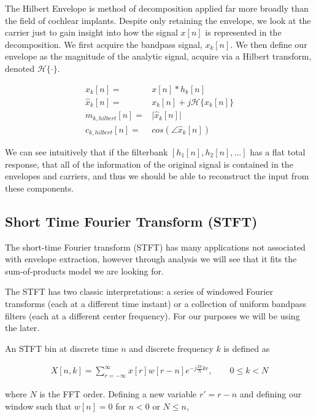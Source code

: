 \documentclass [11pt, proquest] {uwthesis}[2015/03/03]
\begin{document}
The Hilbert Envelope is method of decomposition applied far more broadly than the field of cochlear implants.  Despite only retaining the envelope, we look at the carrier just to gain insight into how the signal $x[n]$ is represented in the decomposition.  We first acquire the bandpass signal, $x_k[n]$.  We then define our envelope as the magnitude of the analytic signal, acquire via a Hilbert transform, denoted $\mathcal{H}\{\cdot\}$.

\begin{align}
x_k[n] =& x[n] * h_k[n] \\
\widehat{x}_k[n] =& x_k[n] + j\mathcal{H}\{x_k[n]\} \\
\label{eq:hilbert_envelope}
m_{k,hilbert}[n] =& \Big| \widehat{x}_k[n] \Big| \\
c_{k,hilbert}[n] =& cos(\angle\widehat{x}_k[n])
\end{align}

We can see intuitively that if the filterbank $[h_1[n], h_2[n], ...]$ has a flat total response, that all of the information of the original signal is contained in the envelopes and carriers, and thus we should be able to reconstruct the input from these components.

\subsection{Short Time Fourier Transform (STFT)}

The short-time Fourier transform (STFT) has many applications not associated with envelope extraction, however through analysis we will see that it fits the sum-of-products model we are looking for.

The STFT has two classic interpretations: a series of windowed Fourier transforms (each at a different time instant) or a collection of uniform bandpass filters (each at a different center frequency).  For our purposes we will be using the later.

An STFT bin at discrete time $n$ and discrete frequency $k$ is defined as

\begin{align}
\label{eq:STFTdefinition}
X[n,k] = \sum\limits_{r=-\infty}^{\infty} x[r] w[r - n] e^{-j\frac{2\pi}{N}kr}, \qquad 0 \leq k < N
\end{align}

where $N$ is the FFT order.  Defining a new variable $r' = r - n$ and defining our window such that  $w[n] = 0$ for $n < 0$ or $N \leq n$,
\end{document}
